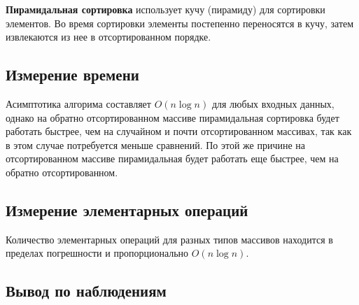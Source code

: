 \documentclass[11pt]{article}
\begin{document}
\textbf{Пирамидальная сортировка} использует кучу (пирамиду) для сортировки
элементов. Во время сортировки элементы постепенно переносятся в кучу, затем извлекаются из нее в отсортированном порядке.

\setcounter{subsection}{0}
\subsection{Измерение времени}

\begin{center}
\end{center}
{ \hspace*{\fill} }

\begin{center}
\end{center}
{ \hspace*{\fill} }

Асимптотика алгорима составляет $O(n\log n)$ для любых входных данных, однако на обратно отсортированном
массиве пирамидальная сортировка будет работать быстрее, чем на случайном и почти отсортированном массивах, так как в этом случае
потребуется меньше сравнений. По этой же причине на отсортированном массиве пирамидальная будет работать еще быстрее, чем на
обратно отсортированном.

\subsection{Измерение элементарных операций}

\begin{center}
\end{center}
{ \hspace*{\fill} }

\begin{center}
\end{center}
{ \hspace*{\fill} }

Количество элементарных операций для разных типов массивов находится в пределах погрешности и
пропорционально $O(n\log n)$.

\subsection{Вывод по наблюдениям}
\end{document}
